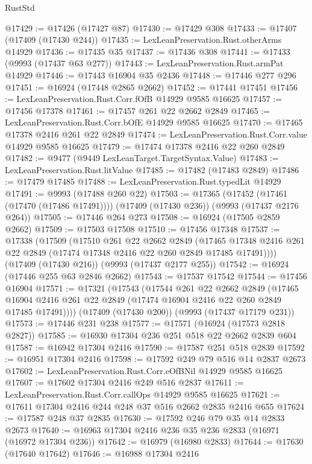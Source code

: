 \begin{lexlean}{RustStd}
\begin{coremodule}
@17429 := @17426 (@17427 @87)
@17430 := @17429 @308
@17433 := @17407 (@17409 (@17430 @244))
@17435 := LexLeanPreservation.Rust.otherArms @14929
@17436 := @17435 @35
@17437 := @17436 @308
@17441 := @17433 (@9993 (@17437 @63 @277))
@17443 := LexLeanPreservation.Rust.armPat @14929
@17446 := @17443 @16904 @35 @2436
@17448 := @17446 @277 @296
@17451 := @16924 (@17448 @2865 @2662)
@17452 := @17441 @17451
@17456 := LexLeanPreservation.Rust.Corr.fOfB @14929 @9585 @16625
@17457 := @17456 @17378
@17461 := @17457 @261 @22 @2662 @2849
@17465 := LexLeanPreservation.Rust.Corr.bOfE @14929 @9585 @16625
@17470 := @17465 @17378 @2416 @261 @22 @2849
@17474 := LexLeanPreservation.Rust.Corr.value @14929 @9585 @16625
@17479 := @17474 @17378 @2416 @22 @260 @2849
@17482 := @9477 (@9449 LexLeanTarget.TargetSyntax.Value)
@17483 := LexLeanPreservation.Rust.litValue
@17485 := @17482 (@17483 @2849)
@17486 := @17479 @17485
@17488 := LexLeanPreservation.Rust.typedLit @14929
@17491 := @9993 (@17488 @260 @22)
@17503 := @17365
    (@17452 (@17461 (@17470 (@17486 @17491))))
    (@17409 (@17430 @236))
    (@9993 (@17437 @2176 @264))
@17505 := @17446 @264 @273
@17508 := @16924 (@17505 @2859 @2662)
@17509 := @17503 @17508
@17510 := @17456 @17348
@17537 := @17338
    (@17509
      (@17510
        @261
        @22
        @2662
        @2849
        (@17465 @17348 @2416 @261 @22 @2849 (@17474 @17348 @2416 @22 @260 @2849 @17485 @17491))))
    (@17409 (@17430 @216))
    (@9993 (@17437 @2177 @255))
@17542 := @16924 (@17446 @255 @63 @2846 @2662)
@17543 := @17537 @17542
@17544 := @17456 @16904
@17571 := @17321
    (@17543
      (@17544
        @261
        @22
        @2662
        @2849
        (@17465 @16904 @2416 @261 @22 @2849 (@17474 @16904 @2416 @22 @260 @2849 @17485 @17491))))
    (@17409 (@17430 @200))
    (@9993 (@17437 @17179 @231))
@17573 := @17446 @231 @238
@17577 := @17571 (@16924 (@17573 @2818 @2827))
@17585 := @16930 @17304 @236 @251 @518 @22 @2662 @2839 @604
@17587 := @16942 @17304 @2416
@17590 := @17587 @251 @518 @2839
@17592 := @16951 @17304 @2416
@17598 := @17592 @249 @79 @516 @14 @2837 @2673
@17602 := LexLeanPreservation.Rust.Corr.eOfBNil @14929 @9585 @16625
@17607 := @17602 @17304 @2416 @249 @516 @2837
@17611 := LexLeanPreservation.Rust.Corr.callOps @14929 @9585 @16625
@17621 := @17611 @17304 @2416 @244 @248 @37 @516 @2662 @2835 @2416 @655
@17624 := @17587 @248 @37 @2835
@17630 := @17592 @246 @79 @35 @14 @2833 @2673
@17640 := @16963 @17304 @2416 @236 @35 @236 @2833 (@16971 (@16972 @17304 @236))
@17642 := @16979 (@16980 @2833)
@17644 := @17630 (@17640 @17642)
@17646 := @16988 @17304 @2416

\end{coremodule}
\end{lexlean}
